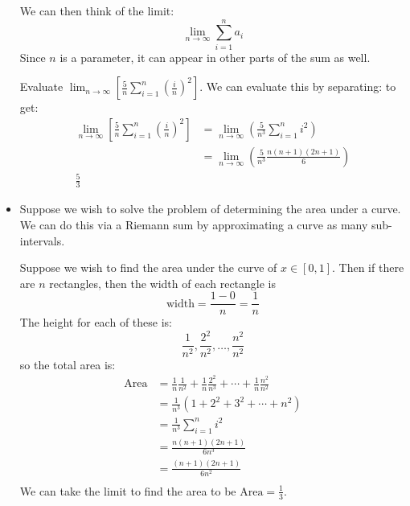 \begin{itemize}
    We can then think of the limit:
    \begin{equation}
        \lim_{n\to\infty}\sum_{i=1}^na_i
        \label{eq:}
    \end{equation}
    Since $n$ is a parameter, it can appear in other parts of the sum as well.
    \begin{example}
        Evaluate $\lim_{n\to \infty}\left[\frac{5}{n}\sum_{i=1}^n\left(\frac{i}{n}\right)^2\right]$. We can evaluate this by separating: to get:
        \begin{align}
            \lim_{n\to \infty}\left[\frac{5}{n}\sum_{i=1}^n\left(\frac{i}{n}\right)^2\right] &= \lim_{n\to\infty} \left(\frac{5}{n^3}\sum_{i=1}^n i^2\right) \\ 
            &= \lim_{n\to\infty} \left(\frac{5}{n^3}\frac{n(n+1)(2n+1)}{6}\right) \\ 
            \frac{5}{3}
        \end{align}
    \end{example}
    \item Suppose we wish to solve the problem of determining the area under a curve. We can do this via a Riemann sum by approximating a curve as many sub-intervals.
    \begin{example}
        Suppose we wish to find the area under the curve of $x \in [0,1]$. Then if there are $n$ rectangles, then the width of each rectangle is
        \begin{equation}
            \text{width} = \frac{1-0}{n}=\frac{1}{n}
            \label{eq:}
        \end{equation}
        The height for each of these is:
        \begin{equation}
            \frac{1}{n^2},\frac{2^2}{n^2},\dots,\frac{n^2}{n^2}
            \label{eq:}
        \end{equation}
        so the total area is:
        \begin{align}
            \text{Area} &= \frac{1}{n}\frac{1}{n^2}+\frac{1}{n}\frac{2^2}{n^3}+\cdots+\frac{1}{n}\frac{n^2}{n^2} \\ 
            &= \frac{1}{n^3}(1+2^2+3^2+\cdots+n^2) \\ 
            &= \frac{1}{n^3}\sum_{i=1}^n i^2 \\ 
            &= \frac{n(n+1)(2n+1)}{6n^3} \\
            &= \frac{(n+1)(2n+1)}{6n^2} \\
        \end{align}
        We can take the limit to find the area to be $\text{Area}=\frac{1}{3}.$

\end{example}
\end{itemize}
